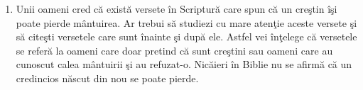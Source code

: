 \begin{enumerate}
	\item Unii oameni cred că există versete în Scriptură care spun că un creştin îşi poate pierde mântuirea. Ar trebui să studiezi cu mare atenţie aceste versete şi să citeşti versetele care sunt înainte şi după ele. Astfel vei înţelege că versetele se referă la oameni care doar pretind că sunt creştini sau oameni care au cunoscut calea mântuirii şi au refuzat-o. Nicăieri în Biblie nu se afirmă că un credincios născut din nou se poate pierde.
	
\end{enumerate}
